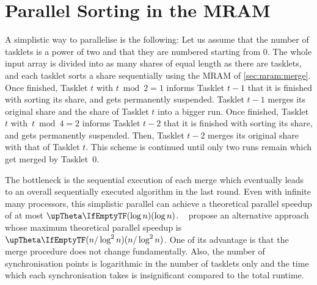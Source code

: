 \chapter{Parallel Sorting in the \ac{MRAM}}
\label{sec:par}

A simplistic way to parallelise \MS{} is the following:
Let us assume that the number of tasklets is a power of two and that they are numbered starting from 0.
The whole input array is divided into as many shares of equal length as there are tasklets, and each tasklet sorts a share sequentially using the \ac{MRAM} \MS{} of \cref{sec:mram:merge}.
Once finished, Tasklet \(t\) with \(t \bmod 2 = 1\) informs Tasklet \(t - 1\) that it is finished with sorting its share, and gets permanently suspended.
Tasklet \(t - 1\) merges its original share and the share of Tasklet \(t\) into a bigger run.
Once finished, Tasklet \(t\) with~\(t \bmod 4 = 2\) informs Tasklet \(t - 2\) that it is finished with sorting its share, and gets permanently suspended.
Then, Tasklet \(t - 2\) merges its original share with that of Tasklet \(t\).
This scheme is continued until only two runs remain which get merged by Tasklet~0.

The bottleneck is the sequential execution of each merge which eventually leads to an overall sequentially executed algorithm in the last round.
Even with infinite many processors, this simplistic parallel \MS{} can achieve a theoretical parallel speedup of at most \(\bigtheta{\log n}\).
~\cite{cormen2013algorithmen} propose an alternative approach whose maximum theoretical parallel speedup is \(\bigtheta{n / \log^2 n}\).
One of its advantage is that the merge procedure does not change fundamentally.
Also, the number of synchronisation points is logarithmic in the number of tasklets only and the time which each synchronisation takes is insignificant compared to the total runtime.

